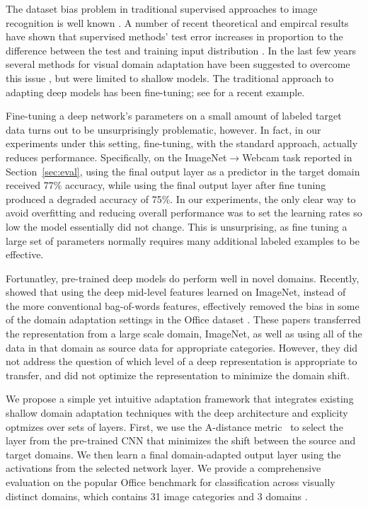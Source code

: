 The dataset bias problem in traditional supervised approaches to image
recognition is well known \cite{efros-cvpr11}.  A number of recent theoretical and empircal 
results have shown that supervised methods' test error increases in
proportion to the difference between the test and training input
distribution \cite{ben2007analysis, blitzer2007learning,saenko-eccv10,efros-cvpr11}.  In the last few
years several methods for visual domain adaptation have been suggested
to overcome this
issue \cite{daume,yang-icdm07,aytar-iccv11,saenko-eccv10,kulis-cvpr11,Khosla-eccv12,gopalan-iccv11,gong-cvpr12,hoffman-eccv12,hoffman-iclr13},
but were limited to shallow models. The traditional approach to
adapting deep models has been fine-tuning; see \cite{rcnn} for a
recent example.  

Fine-tuning a deep network's parameters on a small amount of labeled
target data turns out to be unsurprisingly problematic, however.  In
fact, in our experiments under this setting, fine-tuning, with the
standard approach, actually reduces performance.  Specifically, on the
ImageNet$\rightarrow$Webcam task reported in Section~\ref{sec:eval},
using the final output layer as a predictor in the target domain
received 77\% accuracy, while using the final output layer after fine
tuning produced a degraded accuracy of 75\%. In our experiments, the
only clear way to avoid overfitting and reducing overall performance
was to set the learning rates so low the model essentially did not
change. This is unsurprising, as fine tuning a large set of parameters
normally requires many additional labeled examples to be effective.


Fortunatley, pre-trained deep models do perform well in novel domains.
Recently, \cite{deeplearning-arxiv-2013,hoffman-iclr14} showed that using the deep
mid-level features learned on ImageNet, instead of the more
conventional bag-of-words features, effectively removed the bias in
some of the domain adaptation settings in the Office
dataset \cite{saenko-eccv10}.   These papers transferred
the representation from a large scale domain, ImageNet, as well as using all of the data in that domain as source data for 
appropriate categories.  However, they did not address the question of which level of a deep representation is appropriate to transfer, and did not optimize the representation to minimize the domain shift.  

We propose a simple yet intuitive adaptation framework that integrates
existing shallow domain adaptation techniques with the deep
architecture and explicity optmizes over sets of layers.  First, we
use the A-distance metric~\cite{adist} to select the layer from the
pre-trained CNN that minimizes the shift between the source and target
domains.  We then learn a final domain-adapted output layer using the
activations from the selected network layer.  We provide a
comprehensive evaluation on the popular Office benchmark for
classification across visually distinct domains, which contains 31
image categories and 3 domains \cite{saenko-eccv10}.

